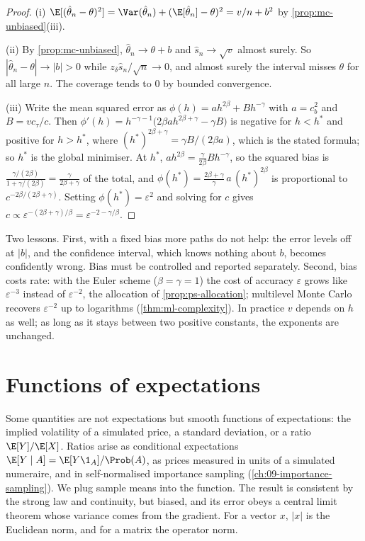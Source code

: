 \begin{proof}
(i) $\E[(\hat\theta_n-\theta)^2]=\Var(\hat\theta_n)+(\E[\hat\theta_n]-\theta)^2=v/n+b^2$ by
\cref{prop:mc-unbiased}(iii).

(ii) By \cref{prop:mc-unbiased}, $\hat\theta_n\to\theta+b$ and $\hat s_n\to\sqrt v$ almost
surely. So $|\hat\theta_n-\theta|\to|b|>0$ while $z_\delta\hat s_n/\sqrt n\to0$, and almost
surely the interval misses $\theta$ for all large $n$. The coverage tends to $0$ by bounded
convergence.

(iii) Write the mean squared error as $\phi(h)=ah^{2\beta}+Bh^{-\gamma}$ with $a=c_b^2$ and
$B=vc_\tau/c$. Then
$\phi'(h)=h^{-\gamma-1}\big(2\beta ah^{2\beta+\gamma}-\gamma B\big)$ is negative for
$h<h^*$ and positive for $h>h^*$, where $(h^*)^{2\beta+\gamma}=\gamma B/(2\beta a)$, which is
the stated formula; so $h^*$ is the global minimiser. At $h^*$,
$ah^{2\beta}=\frac{\gamma}{2\beta}Bh^{-\gamma}$, so the squared bias is
$\frac{\gamma/(2\beta)}{1+\gamma/(2\beta)}=\frac{\gamma}{2\beta+\gamma}$ of the total, and
$\phi(h^*)=\frac{2\beta+\gamma}{\gamma}\,a\,(h^*)^{2\beta}$ is proportional to
$c^{-2\beta/(2\beta+\gamma)}$. Setting $\phi(h^*)=\varepsilon^2$ and solving for $c$ gives
$c\propto\varepsilon^{-(2\beta+\gamma)/\beta}=\varepsilon^{-2-\gamma/\beta}$.
\end{proof}

Two lessons. First, with a fixed bias more paths do not help: the error levels off at $|b|$,
and the confidence interval, which knows nothing about $b$, becomes confidently wrong.
Bias must be controlled and reported separately. Second, bias costs rate: with the Euler
scheme ($\beta=\gamma=1$) the cost of accuracy $\varepsilon$ grows like $\varepsilon^{-3}$
instead of $\varepsilon^{-2}$, the allocation of \cref{prop:ps-allocation};
multilevel Monte Carlo recovers $\varepsilon^{-2}$ up to logarithms (\cref{thm:ml-complexity}).
In practice $v$ depends on $h$ as well; as long as it stays between two positive constants,
the exponents are unchanged.

\section{Functions of expectations}\label{sec:mc-delta}

Some quantities are not expectations but smooth functions of expectations: the implied
volatility of a simulated price, a standard deviation, or a ratio $\E[Y]/\E[X]$. Ratios
arise as conditional expectations $\E[Y\mid A]=\E[Y\1_A]/\Prob(A)$, as prices measured in
units of a simulated numeraire, and in self-normalised importance sampling
(\cref{ch:09-importance-sampling}). We plug sample means into the function. The result is
consistent by the strong law and continuity, but biased, and its error obeys a central
limit theorem whose variance comes from the gradient. For a vector $x$, $|x|$ is the
Euclidean norm, and for a matrix the operator norm.

